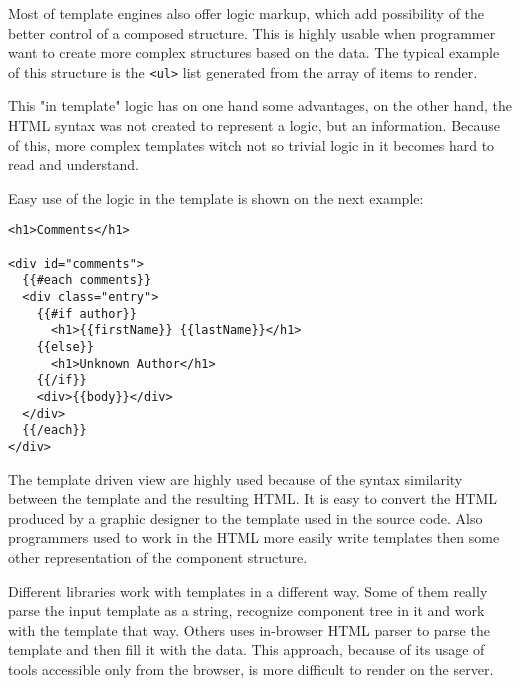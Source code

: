 \documentclass[oneside, 12pt]{book}
\begin{document}


  Most of template engines also offer logic markup, which add possibility of the better control of a composed structure. 
  This is highly usable when programmer want to create more complex structures based on the data. 
  The typical example of this structure is the \texttt{<ul>} list generated from the array of items to render.
  
  This "in template" logic has on one hand some advantages, on the other hand, 
  the HTML syntax was not created to represent a logic, but an information.
  Because of this, more complex templates witch not so trivial logic in it becomes hard to read and understand.
  
  Easy use of the logic in the template is shown on the next example:
\begin{verbatim}
<h1>Comments</h1>

<div id="comments">
  {{#each comments}}
  <div class="entry">
    {{#if author}}
      <h1>{{firstName}} {{lastName}}</h1>
    {{else}}
      <h1>Unknown Author</h1>
    {{/if}}
    <div>{{body}}</div>
  </div>
  {{/each}}
</div>

\end{verbatim}



  The template driven view are highly used because of the syntax similarity between the template and the resulting HTML. 
  It is easy to convert the HTML produced by a graphic designer to the template used in the source code. 
  Also programmers used to work in the HTML more easily write templates then some other representation of the component structure.

  Different libraries work with templates in a different way. 
  Some of them really parse the input template as a string, recognize component tree in it and work with the template that way.
  Others uses in-browser HTML parser to parse the template and then fill it with the data.
  This approach, because of its usage of tools accessible only from the browser, is more difficult to render on the server.
\end{document}
